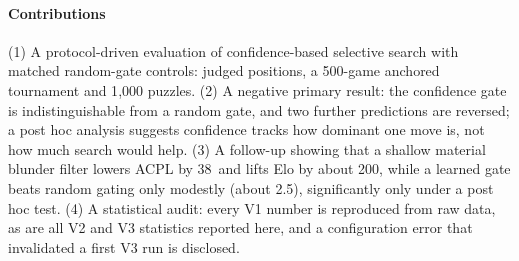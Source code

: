 \paragraph*{Contributions}
(1) A protocol-driven evaluation of confidence-based selective search with matched random-gate controls: \nPos{} judged positions, a 500-game anchored tournament and 1{,}000 puzzles. (2) A negative primary result: the confidence gate is indistinguishable from a random gate, and two further predictions are reversed; a post hoc analysis suggests confidence tracks how dominant one move is, not how much search would help. (3) A follow-up showing that a shallow material blunder filter lowers ACPL by 38\cp\ and lifts Elo by about 200, while a learned gate beats random gating only modestly (about 2.5\cp), significantly only under a post hoc test. (4) A statistical audit: every V1 number is reproduced from raw data, as are all V2 and V3 statistics reported here, and a configuration error that invalidated a first V3 run is disclosed.
